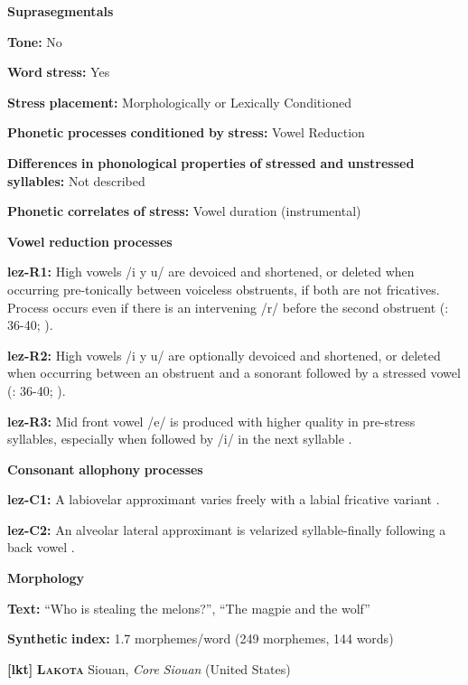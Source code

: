 \begin{styleBody}
\textbf{Suprasegmentals}

\textbf{Tone:} No

\textbf{Word} \textbf{stress:} Yes

\textbf{Stress} \textbf{placement:} Morphologically or Lexically Conditioned

\textbf{Phonetic} \textbf{processes} \textbf{conditioned} \textbf{by} \textbf{stress:} Vowel Reduction

\textbf{Differences} \textbf{in} \textbf{phonological} \textbf{properties} \textbf{of} \textbf{stressed} \textbf{and} \textbf{unstressed} \textbf{syllables:} Not described

\textbf{Phonetic} \textbf{correlates} \textbf{of} \textbf{stress:} Vowel duration (instrumental)

\textbf{Vowel} \textbf{reduction} \textbf{processes}

\textbf{lez-R1:} High vowels /i y u/ are devoiced and shortened, or deleted when occurring pre-tonically between voiceless obstruents, if both are not fricatives. Process occurs even if there is an intervening /r/ before the second obstruent (\citealt{Haspelmath1993}: 36-40; \citealt{ChitoranBabaliyeva2007}).

\textbf{lez-R2:} High vowels /i y u/ are optionally devoiced and shortened, or deleted when occurring between an obstruent and a sonorant followed by a stressed vowel (\citealt{Haspelmath1993}: 36-40; \citealt{ChitoranBabaliyeva2007}).

\textbf{lez-R3:} Mid front vowel /e/ is produced with higher quality in pre-stress syllables, especially when followed by /i/ in the next syllable \citep[32]{Haspelmath1993}.

\textbf{Consonant} \textbf{allophony} \textbf{processes}

\textbf{lez-C1:} A labiovelar approximant varies freely with a labial fricative variant \citep[35]{Haspelmath1993}.

\textbf{lez-C2:} An alveolar lateral approximant is velarized syllable-finally following a back vowel \citep[35]{Haspelmath1993}.

\textbf{Morphology}

\textbf{Text:} “Who is stealing the melons?”, “The magpie and the wolf” \citep[448-456]{Haspelmath1993}

\textbf{Synthetic} \textbf{index:} 1.7 morphemes/word (249 morphemes, 144 words)

\textbf{[lkt]}   \textbf{\textsc{Lakota}}    Siouan, \textit{Core} \textit{Siouan} (United States)


\end{styleBody}
